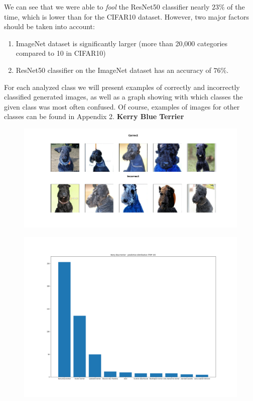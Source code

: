 \documentclass[11pt,a4paper,openany]{book}
\begin{document}
We can see that we were able to \textit{fool} the ResNet50 classifier nearly $23\%$ of the time, which is lower than for the CIFAR10 dataset. However, two major factors should be taken into account:
\begin{enumerate}
\item ImageNet dataset is significantly larger (more than 20,000 categories compared to 10 in CIFAR10)
\item ResNet50 classifier on the ImageNet dataset has an accuracy of $76\%$.
\end{enumerate}
\noindent For each analyzed class we will present examples of correctly and incorrectly classified generated images, as well as a graph showing with which classes the given class was most often confused.  
Of course, examples of images for other classes can be found in Appendix 2.
\newpage
\noindent \textbf{Kerry Blue Terrier} \\
\begin{figure}[ht!]
    \centering
    \includegraphics[scale=0.4]{figs/imagenet_examples/Kerry blue terrier.png}
\end{figure}
\begin{figure}[ht!]
    \centering
    \includegraphics[scale=0.3]{figs/imagenet_examples/Kerry blue terrier_imagenet_dist.png}
\end{figure}
\end{document}
